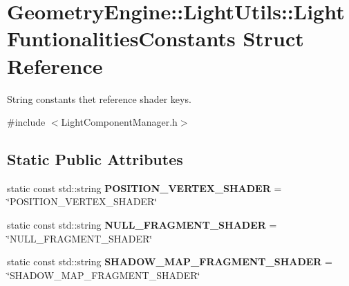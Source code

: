 \hypertarget{struct_geometry_engine_1_1_light_utils_1_1_light_funtionalities_constants}{}\section{Geometry\+Engine\+::Light\+Utils\+::Light\+Funtionalities\+Constants Struct Reference}
\label{struct_geometry_engine_1_1_light_utils_1_1_light_funtionalities_constants}


String constants thet reference shader keys.  




{\ttfamily \#include $<$Light\+Component\+Manager.\+h$>$}

\subsection*{Static Public Attributes}
\begin{DoxyCompactItemize}
\item 
\mbox{\label{struct_geometry_engine_1_1_light_utils_1_1_light_funtionalities_constants_a6f7ce38acc2406912cad4e9874e2b315}} 
static const std\+::string {\bfseries P\+O\+S\+I\+T\+I\+O\+N\+\_\+\+V\+E\+R\+T\+E\+X\+\_\+\+S\+H\+A\+D\+ER} = \char`\"{}P\+O\+S\+I\+T\+I\+O\+N\+\_\+\+V\+E\+R\+T\+E\+X\+\_\+\+S\+H\+A\+D\+ER\char`\"{}
\item 
\mbox{\label{struct_geometry_engine_1_1_light_utils_1_1_light_funtionalities_constants_a6d780f22f30e510ad0532e9c2a2da58c}} 
static const std\+::string {\bfseries N\+U\+L\+L\+\_\+\+F\+R\+A\+G\+M\+E\+N\+T\+\_\+\+S\+H\+A\+D\+ER} = \char`\"{}N\+U\+L\+L\+\_\+\+F\+R\+A\+G\+M\+E\+N\+T\+\_\+\+S\+H\+A\+D\+ER\char`\"{}
\item 
\mbox{\label{struct_geometry_engine_1_1_light_utils_1_1_light_funtionalities_constants_a505c62bfe87f5aa4194466d8d992970e}} 
static const std\+::string {\bfseries S\+H\+A\+D\+O\+W\+\_\+\+M\+A\+P\+\_\+\+F\+R\+A\+G\+M\+E\+N\+T\+\_\+\+S\+H\+A\+D\+ER} = \char`\"{}S\+H\+A\+D\+O\+W\+\_\+\+M\+A\+P\+\_\+\+F\+R\+A\+G\+M\+E\+N\+T\+\_\+\+S\+H\+A\+D\+ER\char`\"{}
\end{DoxyCompactItemize}



